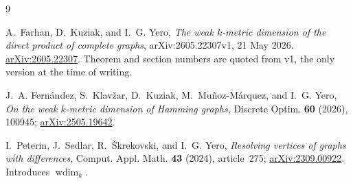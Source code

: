 \documentclass[11pt]{amsart}
\theoremstyle{remark}
\DeclareMathOperator{\wdim}{wdim}
\begin{document}
\begin{thebibliography}{9}

A.~Farhan, D.~Kuziak, and I.~G. Yero,
\emph{The weak $k$-metric dimension of the direct product of complete graphs},
arXiv:2605.22307v1, 21 May 2026.
\href{https://arxiv.org/abs/2605.22307}{arXiv:2605.22307}.
Theorem and section numbers are quoted from v1, the only version at the time of
writing.

J.~A. Fern\'andez, S.~Klav\v{z}ar, D.~Kuziak, M.~Mu\~noz-M\'arquez, and
I.~G. Yero,
\emph{On the weak $k$-metric dimension of Hamming graphs},
Discrete Optim. \textbf{60} (2026), 100945;
\href{https://arxiv.org/abs/2505.19642}{arXiv:2505.19642}.

I.~Peterin, J.~Sedlar, R.~\v{S}krekovski, and I.~G. Yero,
\emph{Resolving vertices of graphs with differences},
Comput. Appl. Math. \textbf{43} (2024), article~275;
\href{https://arxiv.org/abs/2309.00922}{arXiv:2309.00922}.
Introduces $\wdim_k$.

\end{thebibliography}
\end{document}
